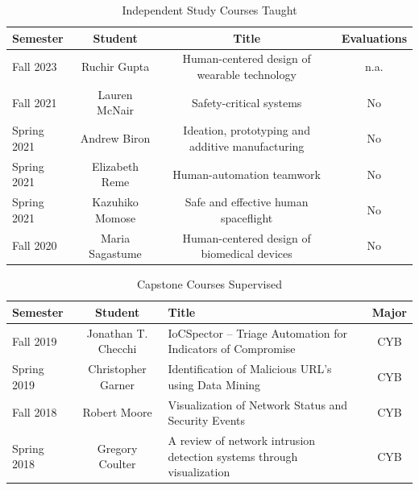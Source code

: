 \documentclass[12pt,letterpaper]{report}
\begin{document}
\begin{table}\caption{Independent Study Courses Taught}
\label{indep}
\center
\begin{tabular}{| l | c | c | c |}
Semester & Student & Title & Evaluations \\ \hline
Fall 2023 & Ruchir Gupta & Human-centered design of wearable technology &  n.a. \\
Fall 2021 & Lauren McNair & Safety-critical systems & No \\
Spring 2021 & Andrew Biron & Ideation, prototyping and additive manufacturing & No \\
Spring 2021 & Elizabeth Reme & Human-automation teamwork & No \\
Spring 2021 & Kazuhiko Momose & Safe and effective human spaceflight & No \\
Fall 2020 & Maria Sagastume & Human-centered design of biomedical devices & No \\
\end{tabular}
\end{table}

\begin{table}\caption{Capstone Courses Supervised}
\label{capstone}
\center
\begin{tabular}{| l | c | p{2in} | c |}
Semester & Student & Title & Major  \\ \hline
Fall 2019 & Jonathan T. Checchi  & IoCSpector – Triage Automation for Indicators of Compromise & CYB \\
Spring 2019 & Christopher Garner &  Identification of Malicious URL’s using Data Mining & CYB\\
Fall 2018 & Robert Moore & Visualization of Network Status and Security Events & CYB \\
Spring 2018 & Gregory Coulter & A review of network intrusion detection systems through visualization & CYB \\
\end{tabular}
\end{table}
\end{document}
